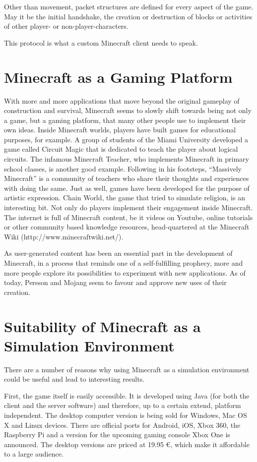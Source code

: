 Other than movement, packet structures are defined for every aspect of the game. May it be the initial handshake, the creation or destruction of blocks or activities of other player- or non-player-characters.

This protocol is what a custom Minecraft client needs to speak.

    \section{Minecraft as a Gaming Platform}
With more and more applications that move beyond the original gameplay of construction and survival, Minecraft seems to slowly shift towards being not only a game, but a gaming platform, that many other people use to implement their own ideas. Inside Minecraft worlds, players have built games for educational purposes, for example. A group of students of the Miami University developed a game called Circuit Magic that is dedicated to teach the player about logical circuits. The infamous Minecraft Teacher, who implements Minecraft in primary school classes, is another good example. Following in his footsteps, ``Massively Minecraft'' is a community of teachers who share their thoughts and experiences with doing the same. Just as well, games have been developed for the purpose of artistic expression. Chain World, the game that tried to simulate religion, is an interesting bit. Not only do players implement their engagement inside Minecraft. The internet is full of Minecraft content, be it videos on Youtube, online tutorials or other community based knowledge resources, head-quartered at the Minecraft Wiki (http://www.minecraftwiki.net/).~\cite{Duncan:2011:MBC:2207096.2207097}

As user-generated content has been an essential part in the development of Minecraft, in a process that reminds one of a self-fulfilling prophecy, more and more people explore its possibilities to experiment with new applications. As of today, Persson and Mojang seem to favour and approve new uses of their creation.~\cite{Duncan:2011:MBC:2207096.2207097}

    \section{Suitability of Minecraft as a Simulation Environment}
There are a number of reasons why using Minecraft as a simulation environment could be useful and lead to interesting results.

First, the game itself is easily accessible. It is developed using Java (for both the client and the server software) and therefore, up to a certain extend, platform independent. The desktop computer version is being sold for Windows, Mac OS X and Linux devices. There are official ports for Android, iOS, Xbox 360, the Raspberry Pi and a version for the upcoming gaming console Xbox One is announced. The desktop versions are priced at 19.95 \euro, which make it affordable to a large audience.

